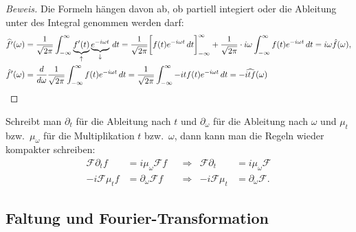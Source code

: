 \begin{proof}[Beweis]
Die Formeln hängen davon ab, ob partiell integiert oder die Ableitung
unter des Integral genommen werden darf:
\begin{align*}
\widehat{f'}(\omega)
&=
\frac{1}{\sqrt{2\pi}}
\int_{-\infty}^\infty \underbrace{f'(t)}_{\uparrow}\underbrace{e^{-i\omega t}}_{\downarrow}\,dt
=
\frac{1}{\sqrt{2\pi}}
\biggl[
f(t)e^{-i\omega t}\,dt
\biggr]_{-\infty}^\infty
+
\frac{1}{\sqrt{2\pi}}
\cdot
i\omega
\int_{-\infty}^\infty f(t)e^{-i\omega t}\,dt
=
i\omega\hat{f}(\omega),
\\
\hat{f}'(\omega)
&=
\frac{d}{d\omega}
\frac{1}{\sqrt{2\pi}} \int_{-\infty}^\infty
f(t) e^{-i\omega t}\,dt
=
\frac{1}{\sqrt{2\pi}} \int_{-\infty}^\infty
-it f(t) e^{-i\omega t}\,dt
=
-\widehat{itf}(\omega)
\qedhere
\end{align*}
\end{proof}

Schreibt man $\partial_t$ für die Ableitung nach $t$ und $\partial_\omega$
für die Ableitung nach $\omega$ und $\mu_{t}$ bzw.~$\mu_{\omega}$ für
die Multiplikation $t$ bzw.~$\omega$, dann kann man die Regeln wieder
kompakter schreiben:
\[
\begin{aligned}
\mathcal{F}\partial_t f &= i\mu_{\omega}\mathcal{F}f
&&\Rightarrow&
\mathcal{F}\partial_t &= i\mu_{\omega}\mathcal{F}
\\
-i\mathcal{F}\mu_t f &= \partial_\omega\mathcal{F} f
&&\Rightarrow&
-i\mathcal{F}\mu_t &= \partial_\omega\mathcal{F}.
\end{aligned}
\]

\subsection{Faltung und Fourier-Transformation
\label{subsection:faltung-und-ft}}

